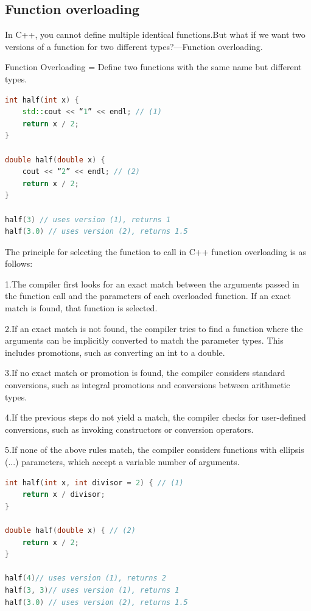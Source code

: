 \documentclass[12pt, a4paper, oneside]{ctexbook}
\begin{document}
\subsection{Function overloading}

In C++, you cannot define multiple identical functions.But what if we want two versions of a function for two different types?---Function overloading.

Function Overloading = Define two functions with the same name but different types.

\begin{lstlisting}[language=c++]
int half(int x) {
    std::cout << “1” << endl; // (1)
    return x / 2;
}

double half(double x) {
    cout << “2” << endl; // (2)
    return x / 2;
}

half(3) // uses version (1), returns 1
half(3.0) // uses version (2), returns 1.5
\end{lstlisting}

The principle for selecting the function to call in C++ function overloading is as follows:

1.The compiler first looks for an exact match between the arguments passed in the function call and the parameters of each overloaded function. If an exact match is found, that function is selected.

2.If an exact match is not found, the compiler tries to find a function where the arguments can be implicitly converted to match the parameter types. This includes promotions, such as converting an int to a double.

3.If no exact match or promotion is found, the compiler considers standard conversions, such as integral promotions and conversions between arithmetic types.

4.If the previous steps do not yield a match, the compiler checks for user-defined conversions, such as invoking constructors or conversion operators.

5.If none of the above rules match, the compiler considers functions with ellipsis (...) parameters, which accept a variable number of arguments.

\begin{lstlisting}[language=c++]
int half(int x, int divisor = 2) { // (1)
    return x / divisor;
}

double half(double x) { // (2)
    return x / 2;
}

half(4)// uses version (1), returns 2
half(3, 3)// uses version (1), returns 1
half(3.0) // uses version (2), returns 1.5
\end{lstlisting}
\end{document}
